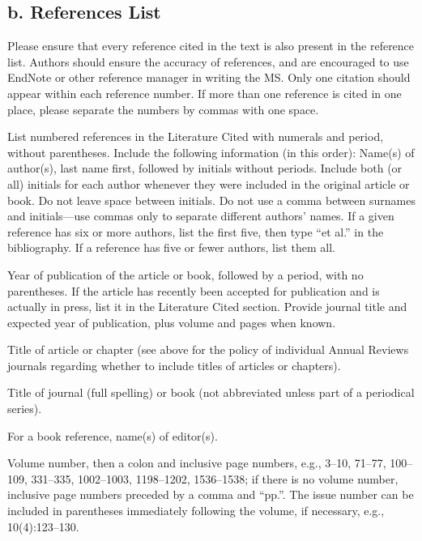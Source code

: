 \documentclass[12pt,a4paper]{article}
\begin{document}
\subsection*{b. References List}

Please ensure that every reference cited in the text is also present in the reference list. Authors should ensure the accuracy of references, and are encouraged to use EndNote or other reference manager in writing the MS. Only one citation should appear within each reference number. If more than one reference is cited in one place, please separate the numbers by commas with one space.

List numbered references in the Literature Cited with numerals and period, without parentheses.
Include the following information (in this order):
Name(s) of author(s), last name first, followed by initials without periods. Include both (or all) initials for each author whenever they were included in the original article or book. Do not leave space between initials. Do not use a comma between surnames and initials—use commas only to separate different authors’ names. If a given reference has six or more authors, list the first five, then type “et al.” in the bibliography. If a reference has five or fewer authors, list them all.
 
Year of publication of the article or book, followed by a period, with no parentheses. If the article has recently been accepted for publication and is actually in press, list it in the Literature Cited section. Provide journal title and expected year of publication, plus volume and pages when known.
 
Title of article or chapter (see above for the policy of individual Annual Reviews journals regarding whether to include titles of articles or chapters).
 
Title of journal (full spelling) or book (not abbreviated unless part of a periodical series).

For a book reference, name(s) of editor(s).

Volume number, then a colon and inclusive page numbers, e.g., 3–10, 71–77, 100–109, 331–335, 1002–1003, 1198–1202, 1536–1538; if there is no volume number, inclusive page numbers preceded by a comma and “pp.”. The issue number can be included in parentheses immediately following the volume, if necessary, e.g., 10(4):123–130.
\end{document}
